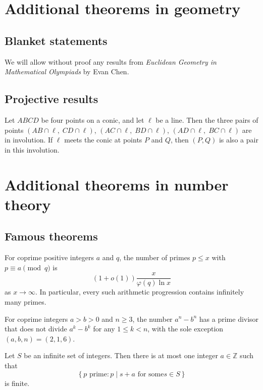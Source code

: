 \documentclass[11pt]{scrartcl}
\providecommand{\ZZ}{\mathbb Z}
\begin{document}
\section{Additional theorems in geometry}
\subsection{Blanket statements}
We will allow without proof any results from
\emph{Euclidean Geometry in Mathematical Olympiads} by Evan Chen.

\subsection{Projective results}
\begin{theorem}
  Let $ABCD$ be four points on a conic, and let $\ell$ be a line.
  Then the three pairs of points
  $(AB \cap \ell,\; CD \cap \ell)$,
  $(AC \cap \ell,\; BD \cap \ell)$,
  $(AD \cap \ell,\; BC \cap \ell)$
  are in involution.
  If $\ell$ meets the conic at points $P$ and $Q$,
  then $(P, Q)$ is also a pair in this involution.
\end{theorem}

\section{Additional theorems in number theory}
\subsection{Famous theorems}
\begin{theorem}
  For coprime positive integers $a$ and $q$,
  the number of primes $p \le x$ with $p \equiv a \pmod{q}$ is
  \[ (1+o(1)) \frac{x}{\varphi(q) \ln x} \]
  as $x \to \infty$.
  In particular, every such arithmetic progression contains infinitely many primes.
\end{theorem}

\begin{theorem}
  For coprime integers $a > b > 0$ and $n \ge 3$,
  the number $a^n - b^n$ has a prime divisor
  that does not divide $a^k - b^k$ for any $1 \le k < n$,
  with the sole exception $(a, b, n) = (2, 1, 6)$.
\end{theorem}

\begin{theorem}
  Let $S$ be an infinite set of integers.
  Then there is at most one integer $a \in \ZZ$ such that
  \[ \left\{ p \text{ prime} : p \mid s + a \text{ for some} s \in S\right\} \]
  is finite.
\end{theorem}
\end{document}
